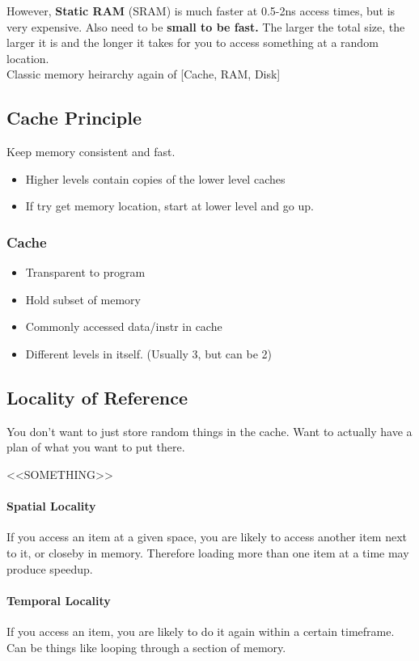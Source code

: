 \documentclass{article}
\begin{document}
		However, \textbf{Static RAM} (SRAM) is much faster at 0.5-2ns access times, but is very expensive. Also need to be \textbf{small to be fast.} The larger the total size, the larger it is and the longer it takes for you to access something at a random location.\\

		Classic memory heirarchy again of [Cache, RAM, Disk]

	\subsection*{Cache Principle}
		Keep memory consistent and fast.
		\begin{itemize}
			\item Higher levels contain copies of the lower level caches
			\item If try get memory location, start at lower level and go up.
		\end{itemize}

		\subsubsection*{Cache}
		\begin{itemize}
			\item Transparent to program
			\item Hold subset of memory
			\item Commonly accessed data/instr in cache
			\item Different levels in itself. (Usually 3, but can be 2)
		\end{itemize}

	\subsection*{Locality of Reference}
		You don't want to just store random things in the cache. Want to actually have a plan of what you want to put there.

		<<SOMETHING>>

		\paragraph{Spatial Locality}
		If you access an item at a given space, you are likely to access another item next to it, or closeby in memory. Therefore loading more than one item at a time may produce speedup. 

		\paragraph{Temporal Locality}
		If you access an item, you are likely to do it again within a certain timeframe. Can be things like looping through a section of memory.
\end{document}
